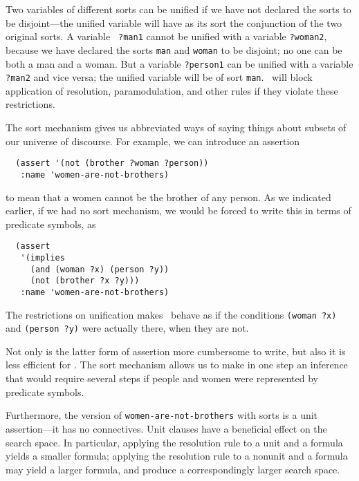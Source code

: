 Two variables of different sorts can be unified if we have not
declared the sorts to be disjoint---the unified variable will have as
its sort the conjunction of the two original sorts.  A variable {\tt
?man1} cannot be unified with a variable {\tt ?woman2}, because we
have declared the sorts {\tt man} and {\tt woman} to be disjoint; no
one can be both a man and a woman.  But a variable {\tt ?person1} can
be unified with a variable {\tt ?man2} and vice versa; the unified
variable will be of sort {\tt man}.  \Snark\  will block application of
resolution, paramodulation, and other rules if they violate these
restrictions.

The sort mechanism gives us abbreviated ways of saying things about
subsets of our universe of discourse.  For example, we can
introduce an assertion
\begin{verbatim}
  (assert '(not (brother ?woman ?person))
   :name 'women-are-not-brothers)
\end{verbatim}
to mean that a women cannot be the brother of any person.  As we indicated
earlier, if we had no sort
mechanism, we would be forced to write this in terms of predicate symbols, as
\begin{verbatim}
  (assert
   '(implies
     (and (woman ?x) (person ?y))
     (not (brother ?x ?y)))
   :name 'women-are-not-brothers)
\end{verbatim}
The restrictions on unification makes \snark\  behave as if the
conditions \verb'(woman ?x)' and \verb'(person ?y)' were actually
there, when they are not.

Not only is the latter form of assertion more cumbersome to write, but
also it is less efficient for \snark\/.  The sort mechanism allows us
to make in one step an inference that would require several steps if
people and women were represented by predicate symbols.

Furthermore, the version of {\tt women-are-not-brothers} with sorts is
a unit assertion---it has no connectives.  Unit clauses have a
beneficial effect on the search space.  In particular, applying the
resolution rule to a unit and a formula yields a smaller formula;
applying the resolution rule to a nonunit and a formula may yield a
larger formula, and produce a correspondingly larger search space.

